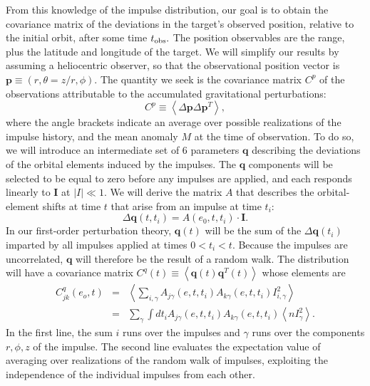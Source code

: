 \documentclass[linenumbers, onecolumn]{aastex631}
\newcommand{\vecI}{\mathbf{I}}
\newcommand{\vecp}{\mathbf{p}}
\newcommand{\vecq}{\mathbf{q}}
\newcommand{\matA}{A}
\newcommand{\covm}{C}
\begin{document}
From this knowledge of the impulse distribution, our goal is to obtain the covariance matrix of the deviations in the target's observed position, relative to the initial orbit, after some time $t_{\rm obs}.$ The position observables are the range, plus the latitude and longitude of the target.  We will simplify our results by assuming a heliocentric observer, so that the observational position vector is $\vecp\equiv (r,\theta=z/r,\phi).$ The quantity we seek is the covariance matrix $\covm^p$ of the observations attributable to the accumulated gravitational perturbations:
\begin{equation}
  \covm^p  \equiv  \left\langle  \Delta\vecp \Delta\vecp^T\right\rangle,  \label{eq:Cp}
\end{equation}
where the angle brackets indicate an average over possible realizations of the impulse history, and the mean anomaly $M$ at the time of observation.  To do so, we will introduce an intermediate set of 6 parameters $\vecq$ describing the deviations of the orbital elements induced by the impulses.  The $\vecq$ components will be selected to be equal to zero before any impulses are applied, and each responds linearly to $\vecI$ at $|I|\ll 1.$
We will derive the matrix $\matA$ that describes the orbital-element shifts at time $t$ that arise from an impulse at time $t_i$: 
\begin{equation}
  \Delta \vecq(t,t_i) = \matA(e_0, t, t_i) \cdot \vecI.
  \label{eq:A}
\end{equation}
In our first-order perturbation theory, $\vecq(t)$ will be the sum of the $\Delta\vecq(t_i)$ imparted by all impulses applied at times $0<t_i<t.$  Because the impulses are uncorrelated, $\vecq$ will therefore be the result of a random walk.  The distribution will have a covariance matrix $\covm^q(t) \equiv \left\langle \vecq(t) \vecq^T(t) \right\rangle$ whose elements are
\begin{eqnarray}
  \covm^q_{jk}(e_o,t) & = & \left\langle \sum_{i,\gamma} \matA_{j\gamma}(e,t,t_i) \matA_{k\gamma}(e,t,t_i) I^2_{i,\gamma} \right\rangle \\
           & = & \sum_\gamma \int dt_i \matA_{j\gamma}(e,t,t_i) \matA_{k\gamma}(e,t,t_i) \left\langle n I_\gamma^2\right\rangle.
\label{eq:Cqjk}
\end{eqnarray}
In the first line, the sum $i$ runs over the impulses and $\gamma$ runs over the components $r,\phi,z$ of the impulse. The second line evaluates the expectation value of averaging over realizations of the random walk of impulses, exploiting the independence of the individual impulses from each other.
\end{document}
